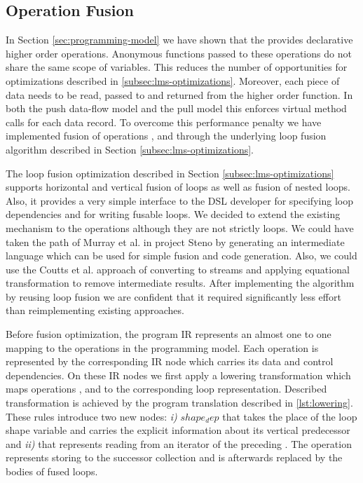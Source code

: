 \subsection{Operation Fusion}
\label{sec:fusion}

In Section \ref{sec:programming-model} we have shown that the  provides declarative higher order operations. Anonymous functions passed to these operations do not share the same scope of variables. This reduces the number of opportunities for optimizations described in \ref{subsec:lms-optimizations}. Moreover, each piece of data needs to be read, passed to and returned from the higher order function. In both the push data-flow model and the pull model this enforces virtual method calls \cite{murray_steno:_2011} for each data record. To overcome this performance penalty we have implemented fusion of operations ,  and  through the underlying loop fusion algorithm described in Section \ref{subsec:lms-optimizations}. 

The loop fusion optimization described in Section \ref{subsec:lms-optimizations} supports horizontal and vertical fusion of loops as well as fusion of nested loops. Also, it provides a very simple interface to the DSL developer for specifying loop dependencies and for writing fusable loops. We decided to extend the existing mechanism to the  operations although they are not strictly loops. We could have taken the path of Murray et al. in project Steno \cite{murray_steno:_2011} by generating an intermediate language which can be used for simple fusion and code generation. Also, we could use the Coutts et al. \cite{coutts_stream_2007} approach of converting  to streams and applying equational transformation to remove intermediate results. After implementing the algorithm by reusing loop fusion we are confident that it required significantly less effort than reimplementing existing approaches.

Before fusion optimization, the program IR represents an almost one to one mapping to the operations in the programming model. Each operation is represented by the corresponding IR node which carries its data and control dependencies. On these IR nodes we first apply a lowering transformation which maps operations ,  and  to the corresponding loop representation. Described transformation is achieved by the program translation described in \ref{lst:lowering}. These rules introduce two new nodes: \emph{i)} $shape_dep$ that takes the place of the loop shape variable and carries the explicit information about its vertical predecessor and \emph{ii)}  that represents reading from an iterator of the preceding . The  operation represents storing to the successor collection and is afterwards replaced by the bodies of fused loops.

